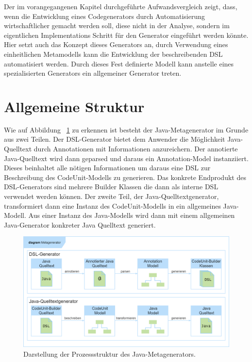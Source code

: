 \documentclass[12pt,oneside,a4paper,parskip]{scrbook}
\begin{document}
Der im vorangegangenen Kapitel durchgeführte Aufwandsvergleich zeigt, dass, wenn die Entwicklung eines Codegenerators durch Automatisierung wirtschaftlicher gemacht werden soll, diese nicht in der Analyse, sondern im eigentlichen Implementations Schritt für den Generator eingeführt werden könnte. Hier setzt auch das Konzept dieses Generators an, durch Verwendung eines einheitlichen Metamodells  kann die Entwicklung der beschreibenden DSL automatisiert werden. Durch dieses Fest definierte Modell kann anstelle eines spezialisierten Generators ein allgemeiner Generator treten.

\section{Allgemeine Struktur}

Wie auf Abbildung ~\ref{fig:meta1} zu erkennen ist besteht der Java-Metagenerator im Grunde aus zwei Teilen. Der DSL-Generator bietet dem Anwender die Möglichkeit Java-Quelltext durch Annotationen mit Informationen anzureichern. Der annotierte Java-Quelltext wird dann geparsed und daraus ein Annotation-Model instanziiert. Dieses beinhaltet alle nötigen Informationen um daraus eine DSL zur Beschreibung des CodeUnit-Modells zu generieren. Das konkrete Endprodukt des DSL-Generators sind mehrere Builder Klassen die dann als interne DSL verwendet werden können. Der zweite Teil, der Java-Quelltextgenerator, transformiert dann eine Instanz des CodeUnit-Modells in ein allgemeines Java-Modell. Aus einer Instanz des Java-Modells wird dann mit einem allgemeinen Java-Generator konkreter Java Quelltext generiert.

\begin{figure}[htbp]
	\centering
	\includegraphics[width=1.0\textwidth]{bilder/metagenProzess}
	\caption{Darstellung der Prozessstruktur des Java-Metagenerators.}
	\label{fig:meta1}
\end{figure}
\end{document}
